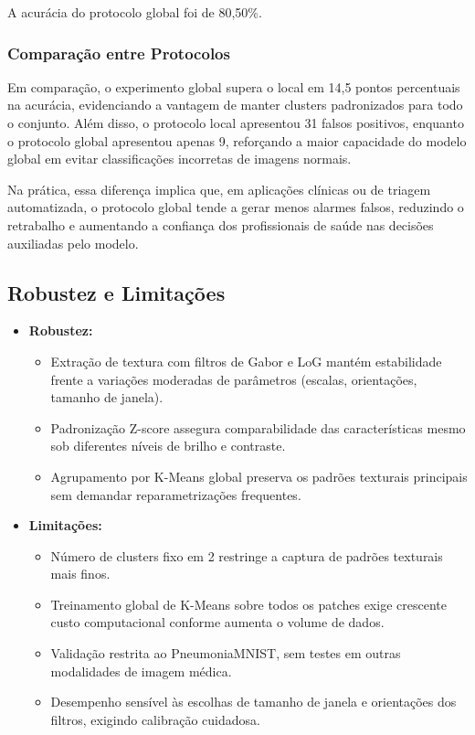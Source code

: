 \documentclass[sigconf,nonacm]{acmart}
\begin{document}
A acurácia do protocolo global foi de 80,50\%.

\subsubsection{Comparação entre Protocolos}

Em comparação, o experimento global supera o local em 14,5 pontos percentuais na acurácia, evidenciando a vantagem de manter clusters padronizados para todo o conjunto. Além disso, o protocolo local apresentou 31 falsos positivos, enquanto o protocolo global apresentou apenas 9, reforçando a maior capacidade do modelo global em evitar classificações incorretas de imagens normais. 

Na prática, essa diferença implica que, em aplicações clínicas ou de triagem automatizada, o protocolo global tende a gerar menos alarmes falsos, reduzindo o retrabalho e aumentando a confiança dos profissionais de saúde nas decisões auxiliadas pelo modelo.

\subsection{Robustez e Limitações}

\begin{itemize}
  \item \textbf{Robustez:}
    \begin{itemize}
      \item Extração de textura com filtros de Gabor e LoG mantém estabilidade frente a variações moderadas de parâmetros (escalas, orientações, tamanho de janela).
      \item Padronização Z-score assegura comparabilidade das características mesmo sob diferentes níveis de brilho e contraste.
      \item Agrupamento por K-Means global preserva os padrões texturais principais sem demandar reparametrizações frequentes.
    \end{itemize}
  \item \textbf{Limitações:}
    \begin{itemize}
      \item Número de clusters fixo em 2 restringe a captura de padrões texturais mais finos.
      \item Treinamento global de K-Means sobre todos os patches exige crescente custo computacional conforme aumenta o volume de dados.
      \item Validação restrita ao PneumoniaMNIST, sem testes em outras modalidades de imagem médica.
      \item Desempenho sensível às escolhas de tamanho de janela e orientações dos filtros, exigindo calibração cuidadosa.
    \end{itemize}
\end{itemize}
\end{document}
